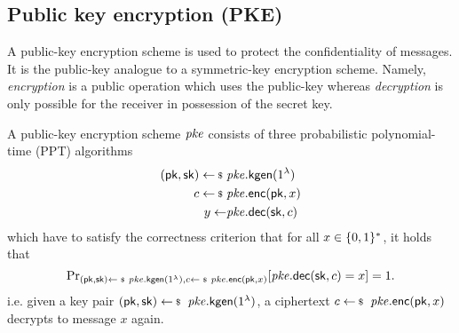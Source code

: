 \newpage
\subsection{Public key encryption (PKE)}
A public-key encryption scheme is used to protect the confidentiality of messages. It is the public-key analogue to a symmetric-key encryption scheme. Namely, \emph{encryption} is a public operation which uses the public-key whereas \emph{decryption} is only possible for the receiver in possession of the secret key.
\begin{syntax}
	A public-key encryption scheme $\mathit{{pke}}$ consists of three probabilistic polynomial-time (PPT) algorithms
	\begin{align*}
		(\pk, \sk) \sample &\pke.\kgen(1^\lambda)\\
		c \sample &\pke.\enc(\pk,x)\\
		y \gets &\pke.\dec(\sk,c) \\
	\end{align*}
	which have to satisfy the correctness criterion that for all $x\in\{0,1\}^*$, it holds that
		\[\probsub{(\pk,\sk)\sample\pke.\kgen(1^\lambda),c\sample\pke.\enc(\pk,x)}{\pke.\dec(\sk,c)=x}=1.\]
	i.e. given a key pair $(\pk,\sk)\sample\pke.\kgen(1^\lambda)$, a ciphertext $c\sample\pke.\enc(\pk,x)$ decrypts to message $x$ again.
\end{syntax}

